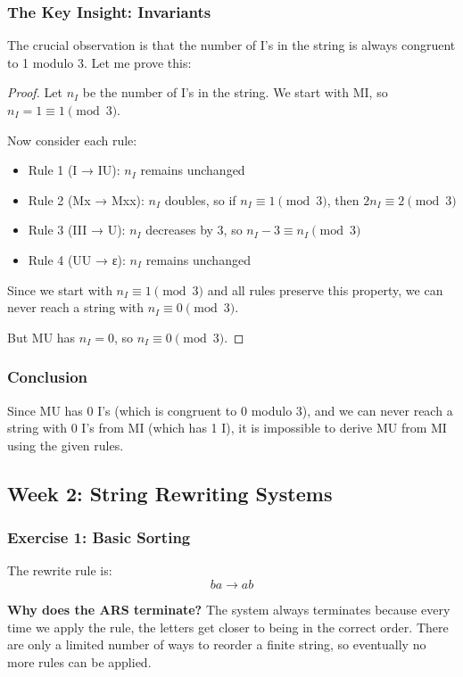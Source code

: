 \documentclass{article}
\theoremstyle{plain}
\theoremstyle{definition}
\theoremstyle{remark}
\begin{document}
\subsubsection{The Key Insight: Invariants}

The crucial observation is that the number of I's in the string is always congruent to 1 modulo 3. Let me prove this:

\begin{proof}
Let $n_I$ be the number of I's in the string. We start with MI, so $n_I = 1 \equiv 1 \pmod{3}$.

Now consider each rule:
\begin{itemize}
\item Rule 1 (I → IU): $n_I$ remains unchanged
\item Rule 2 (Mx → Mxx): $n_I$ doubles, so if $n_I \equiv 1 \pmod{3}$, then $2n_I \equiv 2 \pmod{3}$
\item Rule 3 (III → U): $n_I$ decreases by 3, so $n_I - 3 \equiv n_I \pmod{3}$
\item Rule 4 (UU → ε): $n_I$ remains unchanged
\end{itemize}

Since we start with $n_I \equiv 1 \pmod{3}$ and all rules preserve this property, we can never reach a string with $n_I \equiv 0 \pmod{3}$.

But MU has $n_I = 0$, so $n_I \equiv 0 \pmod{3}$.
\end{proof}

\subsubsection{Conclusion}

Since MU has 0 I's (which is congruent to 0 modulo 3), and we can never reach a string with 0 I's from MI (which has 1 I), it is impossible to derive MU from MI using the given rules.

\subsection{Week 2: String Rewriting Systems}

\subsubsection{Exercise 1: Basic Sorting}

The rewrite rule is:
\[
    ba \to ab
\]

\textbf{Why does the ARS terminate?}
The system always terminates because every time we apply the rule, the letters get closer to being in the correct order. There are only a limited number of ways to reorder a finite string, so eventually no more rules can be applied.
\end{document}
